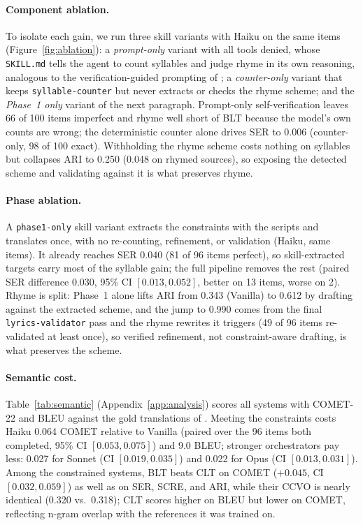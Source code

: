 \documentclass[11pt]{article}
\begin{document}
\paragraph{Component ablation.}
To isolate each gain, we run three skill variants with Haiku on the same items (Figure~\ref{fig:ablation}): a \emph{prompt-only} variant with all tools denied, whose \texttt{SKILL.md} tells the agent to count syllables and judge rhyme in its own reasoning, analogous to the verification-guided prompting of \citet{liu-etal-2026-towards}; a \emph{counter-only} variant that keeps \texttt{syllable-counter} but never extracts or checks the rhyme scheme; and the \emph{Phase~1 only} variant of the next paragraph.
Prompt-only self-verification leaves 66 of 100 items imperfect and rhyme well short of BLT because the model's own counts are wrong; the deterministic counter alone drives SER to 0.006 (counter-only, 98 of 100 exact).
Withholding the rhyme scheme costs nothing on syllables but collapses ARI to 0.250 (0.048 on rhymed sources), so exposing the detected scheme and validating against it is what preserves rhyme.

\paragraph{Phase ablation.}
A \texttt{phase1-only} skill variant extracts the constraints with the scripts and translates once, with no re-counting, refinement, or validation (Haiku, same items).
It already reaches SER 0.040 (81 of 96 items perfect), so skill-extracted targets carry most of the syllable gain; the full pipeline removes the rest (paired SER difference $0.030$, 95\% CI $[0.013, 0.052]$, better on 13 items, worse on 2).
Rhyme is split: Phase~1 alone lifts ARI from 0.343 (Vanilla) to 0.612 by drafting against the extracted scheme, and the jump to 0.990 comes from the final \texttt{lyrics-validator} pass and the rhyme rewrites it triggers (49 of 96 items re-validated at least once), so verified refinement, not constraint-aware drafting, is what preserves the scheme.

\paragraph{Semantic cost.}
Table~\ref{tab:semantic} (Appendix~\ref{app:analysis}) scores all systems with COMET-22 \citep{rei-etal-2022-comet} and BLEU \citep{papineni-etal-2002-bleu} against the gold translations of \citet{ou-etal-2023-songs}.
Meeting the constraints costs Haiku 0.064 COMET relative to Vanilla (paired over the 96 items both completed, 95\% CI $[0.053, 0.075]$) and 9.0 BLEU; stronger orchestrators pay less: 0.027 for Sonnet (CI $[0.019, 0.035]$) and 0.022 for Opus (CI $[0.013, 0.031]$).
Among the constrained systems, BLT beats CLT on COMET ($+0.045$, CI $[0.032, 0.059]$) as well as on SER, SCRE, and ARI, while their CCVO is nearly identical (0.320 vs.\ 0.318); CLT scores higher on BLEU but lower on COMET, reflecting n-gram overlap with the references it was trained on.
\end{document}
